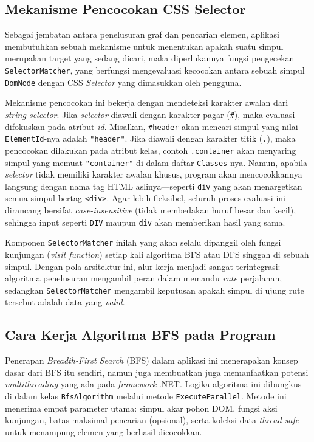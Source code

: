 \documentclass[12pt]{article}
\begin{document}
\subsection{Mekanisme Pencocokan CSS Selector}

Sebagai jembatan antara penelusuran graf dan pencarian elemen, aplikasi membutuhkan sebuah mekanisme untuk menentukan apakah suatu simpul merupakan target yang sedang dicari, maka diperlukannya fungsi pengecekan \texttt{SelectorMatcher}, yang berfungsi mengevaluasi kecocokan antara sebuah simpul \texttt{DomNode} dengan CSS \textit{Selector} yang dimasukkan oleh pengguna.

Mekanisme pencocokan ini bekerja dengan mendeteksi karakter awalan dari \textit{string selector}. Jika \textit{selector} diawali dengan karakter pagar (\verb|#|), maka evaluasi difokuskan pada atribut \textit{id}.  Misalkan, \verb|#header| akan mencari simpul yang nilai \texttt{ElementId}-nya adalah \texttt{"header"}. Jika diawali dengan karakter titik (\verb|.|), maka pencocokan dilakukan pada atribut kelas, contoh \verb|.container| akan menyaring simpul yang memuat \texttt{"container"} di dalam daftar \texttt{Classes}-nya. Namun, apabila \textit{selector} tidak memiliki karakter awalan khusus, program akan mencocokkannya langsung dengan nama tag HTML aslinya---seperti \verb|div| yang akan menargetkan semua simpul bertag \verb|<div>|. Agar lebih fleksibel, seluruh proses evaluasi ini dirancang bersifat \textit{case-insensitive} (tidak membedakan huruf besar dan kecil), sehingga input seperti \verb|DIV| maupun \verb|div| akan memberikan hasil yang sama.

Komponen \texttt{SelectorMatcher} inilah yang akan selalu dipanggil oleh fungsi kunjungan (\textit{visit function}) setiap kali algoritma BFS atau DFS singgah di sebuah simpul. Dengan pola arsitektur ini, alur kerja menjadi sangat terintegrasi: algoritma penelusuran mengambil peran dalam memandu \textit{rute} perjalanan, sedangkan \texttt{SelectorMatcher} mengambil keputusan apakah simpul di ujung rute tersebut adalah data yang \textit{valid}.

\subsection{Cara Kerja Algoritma BFS pada Program}

Penerapan \textit{Breadth-First Search} (BFS) dalam aplikasi ini menerapakan konsep dasar dari BFS itu sendiri, namun juga membuatkan juga memanfaatkan potensi \textit{multithreading} yang ada pada \textit{framework} .NET. Logika algoritma ini dibungkus di dalam kelas \texttt{BfsAlgorithm} melalui metode \texttt{ExecuteParallel}. Metode ini menerima empat parameter utama: simpul akar pohon DOM, fungsi aksi kunjungan, batas maksimal pencarian (opsional), serta koleksi data \textit{thread-safe} untuk menampung elemen yang berhasil dicocokkan.
\end{document}
